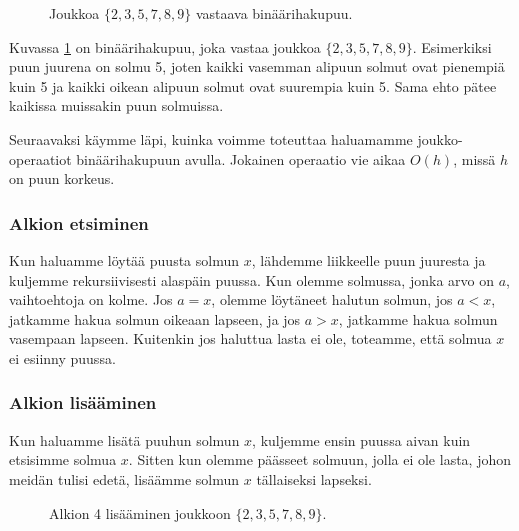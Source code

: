\begin{figure}
\center
{}
\caption{Joukkoa $\{2,3,5,7,8,9\}$ vastaava binäärihakupuu.}
\label{fig:bihpuu}
\end{figure}

Kuvassa \ref{fig:bihpuu} on binäärihakupuu,
joka vastaa joukkoa $\{2,3,5,7,8,9\}$.
Esimerkiksi puun juurena on solmu 5,
joten kaikki vasemman alipuun solmut
ovat pienempiä kuin 5 ja kaikki oikean alipuun
solmut ovat suurempia kuin 5.
Sama ehto pätee kaikissa muissakin puun solmuissa.

Seuraavaksi käymme läpi, kuinka voimme toteuttaa
haluamamme joukko-operaatiot
binäärihakupuun avulla.
Jokainen operaatio vie aikaa $O(h)$,
missä $h$ on puun korkeus.

\subsubsection{Alkion etsiminen}

Kun haluamme löytää puusta solmun $x$, lähdemme liikkeelle
puun juuresta ja kuljemme rekursiivisesti alaspäin puussa.
Kun olemme solmussa, jonka arvo on $a$,
vaihtoehtoja on kolme.
Jos $a=x$, olemme löytäneet halutun solmun,
jos $a<x$, jatkamme hakua solmun oikeaan lapseen,
ja jos $a>x$, jatkamme hakua solmun vasempaan lapseen.
Kuitenkin jos haluttua lasta ei ole, toteamme,
että solmua $x$ ei esiinny puussa.

\subsubsection{Alkion lisääminen}

Kun haluamme lisätä puuhun solmun $x$, kuljemme ensin
puussa aivan kuin etsisimme solmua $x$.
Sitten kun olemme päässeet solmuun,
jolla ei ole lasta, johon meidän tulisi edetä,
lisäämme solmun $x$ tällaiseksi lapseksi.

\begin{figure}
\center
{}
\caption{Alkion 4 lisääminen joukkoon $\{2,3,5,7,8,9\}$.}
\label{fig:bihpu2}
\end{figure}

